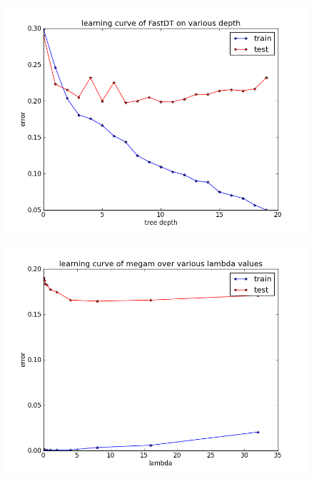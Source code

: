 \documentclass[a4paper,11pt]{article}
\begin{document}
\begin{figure}[!ht]
  \begin{center}
  \includegraphics[width=4.5in]{WU6/learningCurve_FastDT.png}
  \label{figures:wu61}
  \end{center}
\end{figure}
\begin{figure}[!ht]
  \begin{center}
  \includegraphics[width=4.5in]{WU6/learningCurve_megam.png}
    \label{figures:wu62}
  \end{center}
\end{figure}
\end{document}
